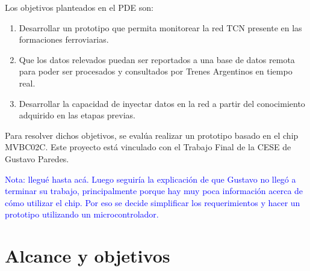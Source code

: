 Los objetivos planteados en el PDE son:

\begin{enumerate}
\item Desarrollar un prototipo que permita monitorear la red TCN presente en las formaciones ferroviarias.
\item Que los datos relevados puedan ser reportados a una base de datos remota para poder ser procesados y consultados por Trenes Argentinos en tiempo real.
\item Desarrollar la capacidad de inyectar datos en la red a partir del conocimiento adquirido en las etapas previas.
\end{enumerate}

Para resolver dichos objetivos, se evalúa realizar un prototipo basado en el chip MVBC02C. Este proyecto está vinculado con el Trabajo Final de la CESE de Gustavo Paredes.

\textcolor{blue}{Nota: llegué hasta acá. Luego seguiría la explicación de que Gustavo no llegó a terminar su trabajo, principalmente porque hay muy poca información acerca de cómo utilizar el chip. Por eso se decide simplificar los requerimientos y hacer un prototipo utilizando un microcontrolador.}

\section{Alcance y objetivos}
